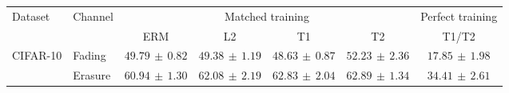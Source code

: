 \begin{tabular*}{\linewidth}{@{\extracolsep{\fill}}llccccc@{}}
\toprule
\multirow{2}{*}{Dataset} & \multirow{2}{*}{Channel} & \multicolumn{4}{c}{Matched training} & Perfect training \\
\cmidrule(lr){3-6}\cmidrule(l){7-7}
 & & ERM & L2 & T1 & T2 & T1/T2 \\
\midrule
\multirow{2}{*}{CIFAR-10} & Fading & $49.79\,\pm\,0.82$ & $49.38\,\pm\,1.19$ & $48.63\,\pm\,0.87$ & $\mathbf{52.23}\,\pm\,2.36$ & $17.85\,\pm\,1.98$ \\
 & Erasure & $60.94\,\pm\,1.30$ & $62.08\,\pm\,2.19$ & $62.83\,\pm\,2.04$ & $\mathbf{62.89}\,\pm\,1.34$ & $34.41\,\pm\,2.61$ \\
\bottomrule
\end{tabular*}

